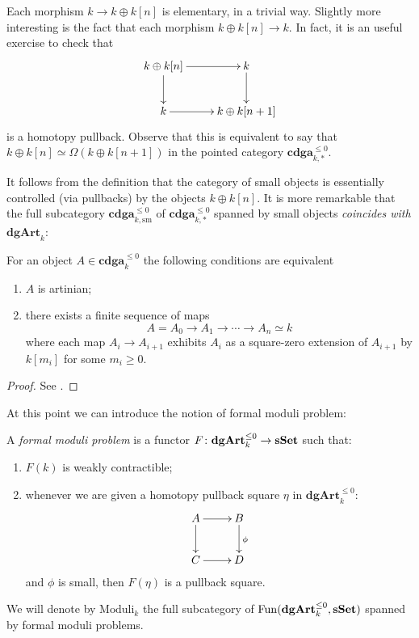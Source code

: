 \begin{refsection}
\begin{eg} \label{eg elementary morphisms}
Each morphism $k \to k \oplus k[n]$ is elementary, in a trivial way. Slightly more interesting is the fact that each morphism $k \oplus k[n] \to k$. In fact, it is an useful exercise to check that
\[
\xymatrix{
k \oplus k[n] \ar[r] \ar[d] & k \ar[d] \\ k \ar[r] & k \oplus k[n+1]
}
\]
is a homotopy pullback. Observe that this is equivalent to say that $k \oplus k[n] \simeq \Omega( k \oplus k[n+1])$ in the pointed category $\mathbf{cdga}_{k,*}^{\le 0}$.
\end{eg}

It follows from the definition that the category of small objects is essentially controlled (via pullbacks) by the objects $k \oplus k[n]$. It is more remarkable that the full subcategory $\mathbf{cdga}_{k, \mathrm{sm}}^{\le 0}$ of $\mathbf{cdga}_{k,*}^{\le 0}$ spanned by small objects \emph{coincides with $\mathbf{dgArt}_k$}:

\begin{prop} \label{prop characterizing artinians}
For an object $A \in \mathbf{cdga}_k^{\le 0}$ the following conditions are equivalent
\begin{enumerate}
\item $A$ is artinian;
\item there exists a finite sequence of maps
\[
A = A_0 \to A_1 \to \cdots \to A_n \simeq k
\]
where each map $A_i \to A_{i+1}$ exhibits $A_i$ as a square-zero extension of $A_{i+1}$ by $k[m_i]$ for some $m_i \ge 0$.
\end{enumerate}
\end{prop}

\begin{proof}
See \cite[Proposition 1.1.11]{dagx}.
\end{proof}

At this point we can introduce the notion of formal moduli problem:

\begin{defin}
A \emph{formal moduli problem} is a functor $F \colon \mathbf{dgArt}_k^{\le 0} \to \mathbf{sSet}$ such that:
\begin{enumerate}
\item $F(k)$ is weakly contractible;
\item whenever we are given a homotopy pullback square $\eta$ in $\mathbf{dgArt}_k^{\le 0}$:
\[
\xymatrix{
A \ar[r] \ar[d] & B \ar[d]^\phi \\ C \ar[r] & D
}
\]
and $\phi$ is small, then $F(\eta)$ is a pullback square.
\end{enumerate}
We will denote by $\mathrm{Moduli}_k$ the full subcategory of $\mathrm{Fun}(\mathbf{dgArt}_k^{\le 0}, \mathbf{sSet})$ spanned by formal moduli problems.
\end{defin}


\end{refsection}
